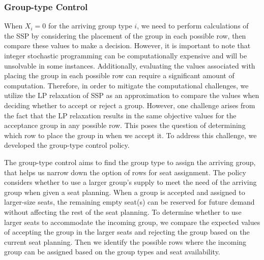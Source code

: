 \subsubsection{Group-type Control}\label{nested_policy}

When $X_i = 0$ for the arriving group type $i$, we need to perform calculations of the SSP by considering the placement of the group in each possible row, then compare these values to make a decision. However, it is important to note that integer stochastic programming can be computationally expensive and will be unsolvable in some instances. Additionally, evaluating the values associated with placing the group in each possible row can require a significant amount of computation. Therefore, in order to mitigate the computational challenges, we utilize the LP relaxation of SSP as an approximation to compare the values when deciding whether to accept or reject a group. However, one challenge arises from the fact that the LP relaxation results in the same objective values for the acceptance group in any possible row. This poses the question of determining which row to place the group in when we accept it. To address this challenge, we developed the group-type control policy.

The group-type control aims to find the group type to assign the arriving group, that helps us narrow down the option of rows for seat assignment. The policy considers whether to use a larger group's supply to meet the need of the arriving group when given a seat planning. When a group is accepted and assigned to larger-size seats, the remaining empty seat(s) can be reserved for future demand without affecting the rest of the seat planning. To determine whether to use larger seats to accommodate the incoming group, we compare the expected values of accepting the group in the larger seats and rejecting the group based on the current seat planning. Then we identify the possible rows where the incoming group can be assigned based on the group types and seat availability.



